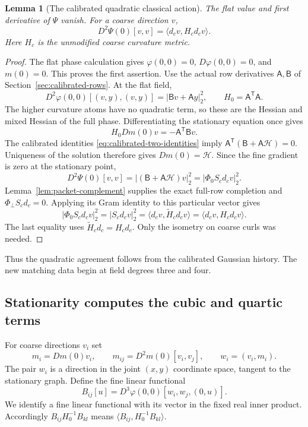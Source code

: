 \documentclass[11pt,reqno]{amsart}
\numberwithin{equation}{section}
\newtheorem{lemma}[theorem]{Lemma}
\theoremstyle{definition}
\theoremstyle{remark}
\begin{document}
\begin{lemma}[The calibrated quadratic classical action]
\label{lem:matching-classical-quadratic}
The flat value and first derivative of \(\Psi\) vanish.
For a coarse direction \(v\),
\begin{equation}
          D^2\Psi(0)[v,v]
                  =\langle d_cv,H_cd_cv\rangle .
 \label{eq:matching-classical-quadratic}
\end{equation}
Here \(H_c\) is the unmodified coarse curvature metric.
\end{lemma}
\begin{proof}
The flat phase calculation gives
\(\varphi(0,0)=0\), \(D\varphi(0,0)=0\), and
\(m(0)=0\). This proves the first assertion.
Use the actual row derivatives \(\mathsf A,\mathsf B\)
of Section~\ref{sec:calibrated-rows}. At the flat field,
\[
 D^2\varphi(0,0)[(v,y),(v,y)]
                           =|\mathsf Bv+\mathsf Ay|_2^2,
                     \qquad H_0=\mathsf A^{\mathsf T}\mathsf A .
\]
The higher curvature atoms have no quadratic term, so
these are the Hessian and mixed Hessian of the full phase.
Differentiating the stationary equation once gives
\[
                    H_0Dm(0)v=-\mathsf A^{\mathsf T}\mathsf Bv.
\]
The calibrated identities
\eqref{eq:calibrated-two-identities} imply
\(\mathsf A^{\mathsf T}(\mathsf B+\mathsf A\mathcal H)=0\).
Uniqueness of the solution therefore gives
\(Dm(0)=\mathcal H\). Since the fine gradient is zero
at the stationary point,
\[
 D^2\Psi(0)[v,v]
      =|(\mathsf B+\mathsf A\mathcal H)v|_2^2
      =|\Phi_0S_cd_cv|_2^2.
\]
Lemma~\ref{lem:packet-complement} supplies the exact
full-row completion and \(\Phi_\perp S_cd_c=0\). Applying
its Gram identity to this particular vector gives
\[
 |\Phi_0S_cd_cv|_2^2=|S_cd_cv|_2^2
      =\langle d_cv,\widetilde H_cd_cv\rangle
      =\langle d_cv,H_cd_cv\rangle .
\]
The last equality uses
\(\widetilde H_cd_c=H_cd_c\).
Only the isometry on coarse curls was needed.
\end{proof}

Thus the quadratic agreement follows from the calibrated
Gaussian history. The new matching data begin at field
degrees three and four.

\subsection{Stationarity computes the cubic and quartic terms}

For coarse directions \(v_i\) set
\[
 m_i=Dm(0)v_i,\qquad
 m_{ij}=D^2m(0)[v_i,v_j],\qquad
                               w_i=(v_i,m_i).
\]
The pair \(w_i\) is a direction in the joint \((x,y)\)
coordinate space, tangent to the stationary graph.
Define the fine linear functional
\begin{equation}
 B_{ij}[u]=D^3\varphi(0,0)[w_i,w_j,(0,u)].
 \label{eq:matching-mixed-cubic}
\end{equation}
We identify a fine linear functional with its vector in the
fixed real inner product. Accordingly
\(B_{ij}H_0^{-1}B_{kl}\) means
\(\langle B_{ij},H_0^{-1}B_{kl}\rangle\).
\end{document}

